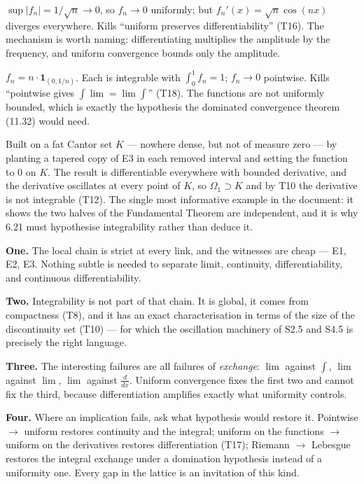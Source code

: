 $\sup|f_n| = 1/\sqrt n \to 0$, so $f_n \to 0$ uniformly; but
$f_n'(x) = \sqrt n\cos(nx)$ diverges everywhere. Kills ``uniform preserves
differentiability'' (T16). The mechanism is worth naming: differentiating
multiplies the amplitude by the frequency, and uniform convergence bounds
only the amplitude.

$f_n = n \cdot \mathbf 1_{(0,1/n)}$. Each is integrable with
$\int_0^1 f_n = 1$; $f_n \to 0$ pointwise. Kills
``pointwise gives $\int \lim = \lim \int$'' (T18). The functions are not
uniformly bounded, which is exactly the hypothesis the dominated convergence
theorem (11.32) would need.

Built on a fat Cantor set $K$ --- nowhere dense, but not of measure zero ---
by planting a tapered copy of E3 in each removed interval and setting the
function to $0$ on $K$. The result is differentiable everywhere with bounded
derivative, and the derivative oscillates at every point of $K$, so
$\Omega_1 \supset K$ and by T10 the derivative is not integrable (T12).
The single most informative example in the document: it shows the two halves
of the Fundamental Theorem are independent, and it is why 6.21 must
hypothesise integrability rather than deduce it.

\begin{recap}
\raggedright
\textbf{One.} The local chain is strict at every link, and the witnesses are
cheap --- E1, E2, E3. Nothing subtle is needed to separate limit,
continuity, differentiability, and continuous differentiability.

\smallskip
\textbf{Two.} Integrability is not part of that chain. It is global, it comes
from compactness (T8), and it has an exact characterisation in terms of the
size of the discontinuity set (T10) --- for which the oscillation machinery
of S2.5 and S4.5 is precisely the right language.

\smallskip
\textbf{Three.} The interesting failures are all failures of \emph{exchange}:
$\lim$ against $\int$, $\lim$ against $\lim$, $\lim$ against $\frac{d}{dx}$.
Uniform convergence fixes the first two and cannot fix the third, because
differentiation amplifies exactly what uniformity controls.

\smallskip
\textbf{Four.} Where an implication fails, ask what hypothesis would restore
it. Pointwise $\to$ uniform restores continuity and the integral; uniform on
the functions $\to$ uniform on the derivatives restores differentiation
(T17); Riemann $\to$ Lebesgue restores the integral exchange under a
domination hypothesis instead of a uniformity one. Every gap in the lattice
is an invitation of this kind.
\end{recap}
